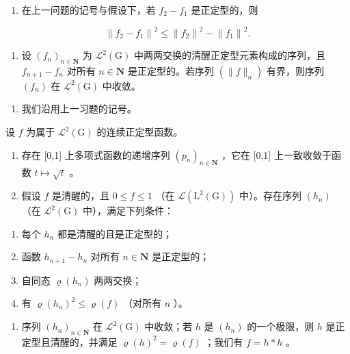 \begin{enumerate}
\def\labelenumi{\alph{enumi})}
\setcounter{enumi}{5}
\tightlist
\item
  在上一问题的记号与假设下，若 \(f_{2} - f_{1}\) 是正定型的，则
\end{enumerate}

\[
\left\| f _ {2} - f _ {1} \right\| ^ {2} \leqslant \left\| f _ {2} \right\| ^ {2} - \left\| f _ {1} \right\| ^ {2}.
\]

\begin{enumerate}
\def\labelenumi{\alph{enumi})}
\setcounter{enumi}{6}
\tightlist
\item
  设 \((f_n)_{n\in \mathbf{N}}\) 为 \(\mathcal{L}^2 (\mathrm{G})\) 中两两交换的清醒正定型元素构成的序列，且 \(f_{n + 1} - f_n\) 对所有 \(n\in \mathbf{N}\) 是正定型的。若序列 \((\| f\| _n)\) 有界，则序列 \((f_n)\) 在 \(\mathcal{L}^2 (\mathrm{G})\) 中收敛。
\end{enumerate}

\begin{enumerate}
\def\labelenumi{\arabic{enumi})}
\setcounter{enumi}{21}
\tightlist
\item
  我们沿用上一习题的记号。
\end{enumerate}

设 \(f\) 为属于 \(\mathcal{L}^2 (\mathrm{G})\) 的连续正定型函数。

\begin{enumerate}
\def\labelenumi{\alph{enumi})}
\item
  存在 [0,1] 上多项式函数的递增序列 \((p_{n})_{n\in\mathbf{N}}\) ，它在 [0,1] 上一致收敛于函数 \(t\mapsto\sqrt{t}\) 。
\item
  假设 \(f\) 是清醒的，且 \(0 \leqslant f \leqslant 1\) （在 \(\mathcal{L}(\mathrm{L}^2(\mathrm{G}))\) 中）。存在序列 \((h_n)\) （在 \(\mathcal{L}^2(\mathrm{G})\) 中），满足下列条件：
\end{enumerate}

\begin{enumerate}
\def\labelenumi{(\roman{enumi})}
\item
  每个 \(h_n\) 都是清醒的且是正定型的；
\item
  函数 \(h_{n+1} - h_n\) 对所有 \(n \in \mathbf{N}\) 是正定型的；
\item
  自同态 \(\varrho(h_n)\) 两两交换；
\item
  有 \(\varrho(h_n)^2 \leqslant \varrho(f)\) （对所有 \(n\) ）。
\end{enumerate}

\begin{enumerate}
\def\labelenumi{\alph{enumi})}
\setcounter{enumi}{2}
\tightlist
\item
  序列 \((h_n)_{n\in \mathbf{N}}\) 在 \(\mathcal{L}^2 (\mathrm{G})\) 中收敛；若 \(h\) 是 \((h_n)\) 的一个极限，则 \(h\) 是正定型且清醒的，并满足 \(\varrho (h)^2 = \varrho (f)\) ；我们有 \(f = h*h\) 。
\end{enumerate}

